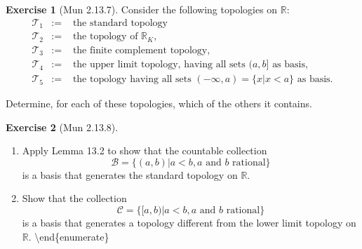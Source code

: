 \documentclass[
]{book}
\providecommand{\tightlist}{%
  \setlength{\itemsep}{0pt}\setlength{\parskip}{0pt}}
\theoremstyle{definition}
\theoremstyle{definition}
\theoremstyle{definition}
\newtheorem{exercise}{Exercise}[chapter]
\theoremstyle{definition}
\theoremstyle{remark}
\begin{document}
\begin{exercise}[Mun 2.13.7]
\protect\hypertarget{exr:unnamed-chunk-112}{}\label{exr:unnamed-chunk-112}Consider the following topologies on \(\mathbb{R}\):
\begin{eqnarray}
\mathcal{T}_1 &:=& \text{ the standard topology}\\
\mathcal{T}_2 &:=& \text{ the topology of $\mathbb{R}_K$,}\\
\mathcal{T}_3 &:=& \text{ the finite complement topology,}\\
\mathcal{T}_4 &:=& \text{ the upper limit topology, having all sets $(a, b]$ as basis,}\\
\mathcal{T}_5 &:=& \text{ the topology having all sets $(-\infty, a) = \{x | x < a\}$ as basis.}
\end{eqnarray}

Determine, for each of these topologies, which of the others it contains.
\end{exercise}

\begin{exercise}[Mun 2.13.8]
\protect\hypertarget{exr:unnamed-chunk-113}{}\label{exr:unnamed-chunk-113}\leavevmode

\begin{enumerate}
\def\labelenumi{(\alph{enumi})}
\tightlist
\item
  Apply Lemma 13.2 to show that the countable collection
  \[ \mathcal{B} = \{(a, b) | a < b, a \text{ and } b \text{ rational}\} \]
  is a basis that generates the standard topology on \(\mathbb{R}\).
\item
  Show that the collection
  \[ \mathcal{C} = \{[a, b) | a < b, a \text{ and } b \text{ rational}\} \]
  is a basis that generates a topology different from the lower limit topology on \(\mathbb{R}\).
  \textbackslash end\{enumerate\}
\end{enumerate}

\end{exercise}
\end{document}

